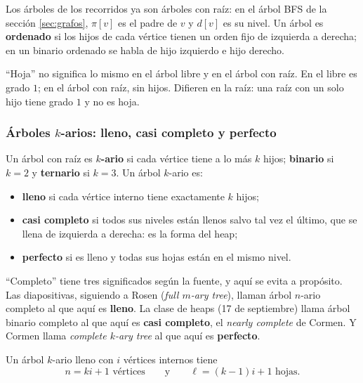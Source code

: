 \documentclass[11pt,letterpaper]{article}
\begin{document}
Los árboles de los recorridos ya son árboles con raíz: en el árbol BFS
de la sección \ref{sec:grafos}, $\pi[v]$ es el padre de $v$ y $d[v]$
es su nivel. Un árbol es \textbf{ordenado} si los hijos de cada
vértice tienen un orden fijo de izquierda a derecha; en un binario
ordenado se habla de hijo izquierdo e hijo derecho.

\begin{ojo}
  ``Hoja'' no significa lo mismo en el árbol libre y en el árbol con
  raíz. En el libre es grado $1$; en el árbol con raíz, sin hijos.
  Difieren en la raíz: una raíz con un solo hijo tiene grado $1$ y no
  es hoja.
\end{ojo}

\subsubsection*{Árboles $k$-arios: lleno, casi completo y perfecto}

\begin{definicion}
  \label{def:arbol-kario}
  Un árbol con raíz es \textbf{$k$-ario} si cada vértice tiene a lo más
  $k$ hijos; \textbf{binario} si $k = 2$ y \textbf{ternario} si
  $k = 3$. Un árbol $k$-ario es:
  \begin{itemize}[itemsep=0.1em]
    \item \textbf{lleno} si cada vértice interno tiene exactamente $k$
          hijos;
    \item \textbf{casi completo} si todos sus niveles están llenos
          salvo tal vez el último, que se llena de izquierda a
          derecha: es la forma del heap;
    \item \textbf{perfecto} si es lleno y todas sus hojas están en el
          mismo nivel.
  \end{itemize}
\end{definicion}

\begin{ojo}
  ``Completo'' tiene tres significados según la fuente, y aquí se
  evita a propósito. Las diapositivas, siguiendo a Rosen
  (\textit{full $m$-ary tree}), llaman árbol $n$-ario completo al que
  aquí es \textbf{lleno}. La clase de heaps (17 de septiembre) llama
  árbol binario completo al que aquí es \textbf{casi completo}, el
  \textit{nearly complete} de Cormen. Y Cormen llama
  \textit{complete $k$-ary tree} al que aquí es \textbf{perfecto}.
\end{ojo}

\begin{teorema}
  \label{teo:arbol-conteo}
  Un árbol $k$-ario lleno con $i$ vértices internos tiene
  \[
    n = ki + 1 \text{ vértices} \qquad \text{y} \qquad
    \ell = (k - 1)i + 1 \text{ hojas.}
  \]
\end{teorema}
\end{document}
